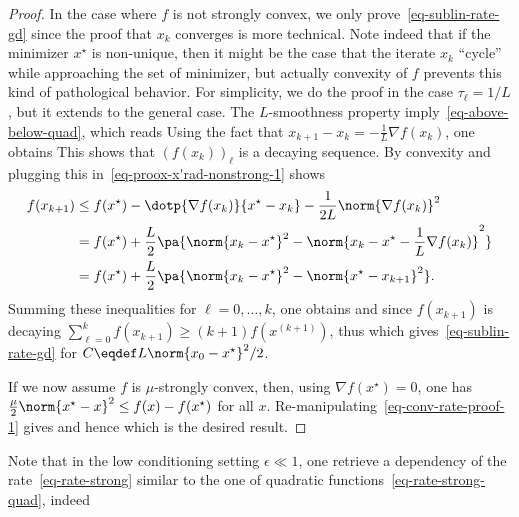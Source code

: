 \begin{proof}
	In the case where $f$ is not strongly convex, we only prove~\eqref{eq-sublin-rate-gd} since the proof that $x_k$ converges is more technical. Note indeed that if the minimizer $x^\star$ is non-unique, then it might be the case that the iterate $x_k$ ``cycle'' while approaching the set of minimizer, but actually convexity of $f$ prevents this kind of pathological behavior. 
	For simplicity, we do the proof in the case $\tau_\ell = 1/L$, but it extends to the general case. 
	The $L$-smoothness property imply~\eqref{eq-above-below-quad}, which reads
	Using the fact that $x_{k+1}-x_k = -\frac{1}{L} \nabla f(x_k)$, one obtains
	This shows that $(f(x_k))_\ell$ is a decaying sequence.
	By convexity
	and plugging this in~\eqref{eq-proox-x'rad-nonstrong-1} shows
	\begin{align}
		f(x_{k+1})  &\leq   
		f(x^\star) - \dotp{\nabla f(x_k)}{x^\star-x_k} - \frac{1}{2L} \norm{\nabla f(x_k)}^2 \\
		&= f(x^\star) + \frac{L}{2}\pa{
			\norm{x_k-x^\star}^2 - \norm{x_k-x^\star-\frac{1}{L}\nabla f(x_k)}^2
		}\\
		&= f(x^\star) + \frac{L}{2}\pa{
			\norm{x_k-x^\star}^2 - \norm{x^\star-x_{k+1}}^2 }. \label{eq-conv-rate-proof-1}
	\end{align}
	Summing these inequalities for $\ell=0,\ldots,k$, one obtains
	and since $f(x_{k+1})$ is decaying $\sum_{\ell=0}^k f(x_{k+1}) \geq (k+1) f(x^{(k+1)})$, thus 
	which gives~\eqref{eq-sublin-rate-gd} for $C \eqdef L \norm{x_0-x^\star}^2/2$.
	
	If we now assume $f$ is $\mu$-strongly convex, then, using $\nabla f(x^\star)=0$, one has $\frac{\mu}{2}\norm{x^\star-x}^2 \leq f(x)-f(x^\star)$ for all $x$. 
	Re-manipulating~\eqref{eq-conv-rate-proof-1} gives
	and hence
	which is the desired result. 
\end{proof}

Note that in the low conditioning setting $\epsilon \ll 1$, one retrieve a dependency of the rate~\eqref{eq-rate-strong} similar to the one of quadratic functions~\eqref{eq-rate-strong-quad}, indeed 

